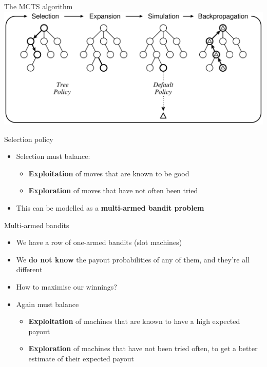 \begin{frame}{The MCTS algorithm}
	\includegraphics[width=\textwidth]{mcts}
\end{frame}

\begin{frame}{Selection policy}
	\begin{itemize}
		\pause\item Selection must balance:
			\begin{itemize}
				\pause\item \textbf{Exploitation} of moves that are known to be good
				\pause\item \textbf{Exploration} of moves that have not often been tried
			\end{itemize}
		\pause\item This can be modelled as a \textbf{multi-armed bandit problem}
	\end{itemize}
\end{frame}

\begin{frame}{Multi-armed bandits}
	\begin{itemize}
		\pause\item We have a row of one-armed bandits (slot machines)
		\pause\item We \textbf{do not know} the payout probabilities of any of them, and they're all different
		\pause\item How to maximise our winnings?
		\pause\item Again must balance
			\begin{itemize}
				\pause\item \textbf{Exploitation} of machines that are known to have a high expected payout
				\pause\item \textbf{Exploration} of machines that have not been tried often, to get a better estimate of their expected payout
			\end{itemize}
	\end{itemize}
\end{frame}

